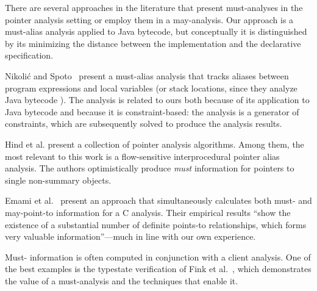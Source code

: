 There are several approaches in the literature that present
must-analyses in the pointer analysis setting or employ them in a
may-analysis. Our approach is a must-alias analysis applied to Java
bytecode, but conceptually it is distinguished by its minimizing the
distance between the implementation and the declarative specification.


Nikoli\'{c} and Spoto~\cite{DBLP:conf/ictac/NikolicS12} present a
must-alias analysis that tracks aliases between program expressions
and local variables (or stack locations, since they analyze Java
bytecode%
).  The analysis
is related to ours both because of its application to Java bytecode
and because it is constraint-based: the analysis is a generator of
constraints, which are subsequently solved to produce the analysis
results.

Hind et al. \cite{Hind:1999:IPA:325478.325519} present a collection of pointer
analysis algorithms. Among them, the most relevant to this work is a
flow-sensitive interprocedural pointer alias analysis. The authors
optimistically produce \emph{must} information for pointers to single
non-summary objects.

Emami et al.~\cite{emami-etal-pldi94} present an approach that
simultaneously calculates both must- and may-point-to information for
a C analysis. Their empirical results ``show the existence of a
substantial number of definite points-to relationships, which forms
very valuable information''---much in line with our own
experience.

Must- information is often computed in conjunction with a
client analysis. One of the best examples is the typestate
verification of Fink et al.~\cite{1146254}, which demonstrates the value of
a must-analysis and the techniques that enable it.

